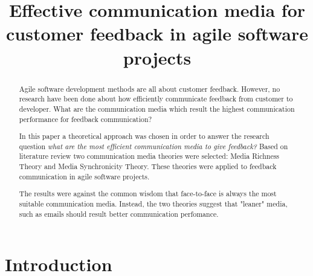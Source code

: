 \documentclass[conference]{IEEEtran}
\begin{document}
%
\title{Effective communication media for customer feedback in agile software projects}

\author{
}

\maketitle


\begin{abstract}

Agile software development methods are all about customer feedback. However, no research have been done about how efficiently communicate feedback from customer to developer. What are the communication media which result the highest communication performance for feedback communication?

In this paper a theoretical approach was chosen in order to answer the research question \textit{what are the most efficient communication media to give feedback?} Based on literature review two communication media theories were selected: Media Richness Theory and Media Synchronicity Theory. These theories were applied to feedback communication in agile software projects.

The results were against the common wisdom that face-to-face is always the most suitable communication media. Instead, the two theories suggest that "leaner" media, such as emails should result better communication perfomance. 

\end{abstract}

\IEEEpeerreviewmaketitle



\section{Introduction}
\end{document}
